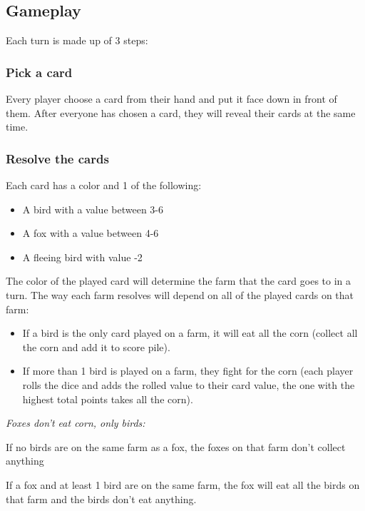 \documentclass[conference]{IEEEtran}
\begin{document}
\subsection{Gameplay}

Each turn is made up of 3 steps:

\subsubsection{Pick a card} 

Every player choose a card from their hand and put it face down in front of them. After everyone has chosen a card, they will reveal their cards at the same time.

\subsubsection{Resolve the cards}

Each card has a color and 1 of the following:

\begin{itemize}
    \item A bird with a value between 3-6
    \item A fox with a value between 4-6
    \item A fleeing bird with value -2
\end{itemize}

The color of the played card will determine the farm that the card goes to in a turn. The way each farm resolves will depend on all of the played cards on that farm:

\begin{itemize}
    \item If a bird is the only card played on a farm, it will eat all the corn (collect all the corn and add it to score pile).
    \item If more than 1 bird is played on a farm, they fight for the corn (each player rolls the dice and adds the rolled value to their card value, the one with the highest total points takes all the corn).
\end{itemize}

\vspace{0.2cm}

\textit{Foxes don't eat corn, only birds:}

If no birds are on the same farm as a fox, the foxes on that farm don't collect anything

If a fox and at least 1 bird are on the same farm, the fox will eat all the birds on that farm and the birds don't eat anything.
\end{document}
